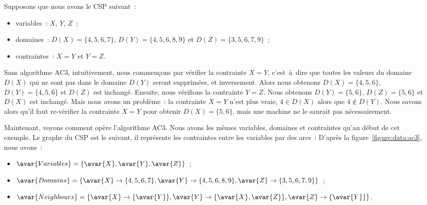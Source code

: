 \begin{example}
\label{example:data:ac3}

Supposons que nous avons le CSP suivant~:
%
\begin{itemize}

\item variables~: $X$, $Y$, $Z$~;

\item domaines~: $D(X) = \{4, 5, 6, 7\}$, $D(Y) = \{4, 5, 6, 8, 9\}$ et $D(Z) =
\{3, 5, 6, 7, 9\}$~;

\item contraintes~: $X = Y$ et $Y = Z$.

\end{itemize}

Sans algorithme AC3, intuitivement, nous commençons par vérifier la contrainte
$X = Y$, c'est~à~dire que toutes les valeurs du domaine $D(X)$ qui ne sont pas
dans le domaine $D(Y)$ seront supprimées, et inversement. Alors nous obtenons
$D(X) = \{4, 5, 6\}$, $D(Y) = \{4, 5, 6\}$ et $D(Z)$ est inchangé. Ensuite, nous
vérifions la contrainte $Y = Z$. Nous obtenons $D(Y) = \{5, 6\}$, $D(Z) = \{5,
6\}$ et $D(X)$ est inchangé. Mais nous avons un problème~: la contrainte $X = Y$
n'est plus vraie, $4 \in D(X)$ alors que $4 \notin D(Y)$. Nous savons alors
qu'il faut re-vérifier la contrainte $X = Y$ pour obtenir $D(X) = \{5, 6\}$,
mais une machine ne le saurait pas nécessairement.

Maintenant, voyons comment opère l'algorithme AC3. Nous avons les mêmes
variables, domaines et contraintes qu'au début de cet exemple. Le graphe du CSP
est le suivant, il représente les contraintes entre les variables par des arcs~:
%
%
D'après la figure~\ref{figure:data:ac3}, nous avons~:
%
\begin{itemize}

\item $\avar{Variables} = \{\avar{X}, \avar{Y}, \avar{Z}\}$~;

\item $\avar{Domains} = \{\avar{X} \rightarrow \{4, 5, 6, 7\}, \avar{Y}
\rightarrow \{4, 5, 6, 8, 9\}, \avar{Z} \rightarrow \{3, 5, 6, 7, 9\}\}$~;

\item $\avar{Neighbours} = \{\avar{X} \rightarrow \{\avar{Y}\}, \avar{Y}
\rightarrow \{\avar{X}, \avar{Z}\}, \avar{Z} \rightarrow \{\avar{Y}\}\}$.


\end{itemize}
\end{example}
